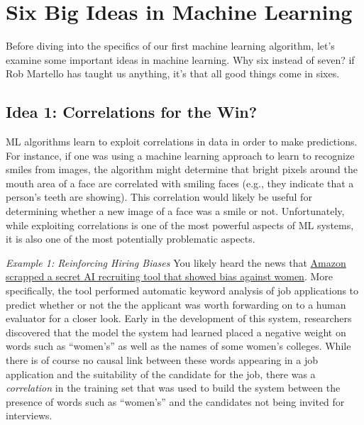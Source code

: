 \documentclass[assignment01_Solutions]{subfiles}
\begin{document}
\section{Six Big Ideas in Machine Learning}
Before diving into the specifics of our first machine learning algorithm, let's examine some important ideas in machine learning.  Why six instead of seven?  if Rob Martello has taught us anything, it's that all good things come in sixes.%


\subsection*{Idea 1: Correlations for the Win?}
ML algorithms learn to exploit correlations in data in order to make predictions.  For instance, if one was using a machine learning approach to learn to recognize smiles from images, the algorithm might determine that bright pixels around the mouth area of a face are correlated with smiling faces (e.g., they indicate that a person's teeth are showing).  This correlation would likely be useful for determining whether a new image of a face was a smile or not.  Unfortunately, while exploiting correlations is one of the most powerful aspects of ML systems, it is also one of the most potentially problematic aspects.


\bi

\item \emph{Example 1: Reinforcing Hiring Biases}
You likely heard the news that \href{https://www.reuters.com/article/us-amazon-com-jobs-automation-insight/amazon-scraps-secret-ai-recruiting-tool-that-showed-bias-against-women-idUSKCN1MK08G}{Amazon scrapped a secret AI recruiting tool that showed bias against women}.  More specifically, the tool performed automatic keyword analysis of job applications to predict whether or not the the applicant was worth forwarding on to a human evaluator for a closer look.  Early in the development of this system, researchers discovered that the model the system had learned placed a negative weight on words such as ``women's'' as well as the names of some women's colleges.  While there is of course no causal link between these words appearing in a job application and the suitability of the candidate for the job, there was a \emph{correlation} in the training set that was used to build the system between the presence of words such as ``women's'' and the candidates not being invited for interviews.
\end{document}
